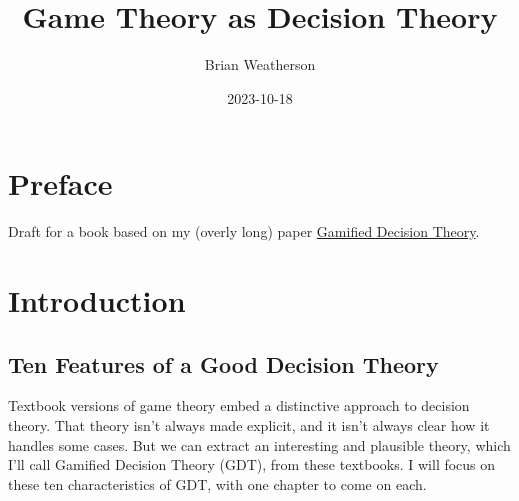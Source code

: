 \documentclass[
  12pt,
  letterpaper,
  DIV=11,
  numbers=noendperiod]{scrreprt}
\title{Game Theory as Decision Theory}
\author{Brian Weatherson}
\date{2023-10-18}
\renewcommand*\contentsname{Table of contents}
\newcommand\contentsname{Table of contents}
\begin{document}
\maketitle
\ifdefined\Shaded\renewenvironment{Shaded}{\begin{tcolorbox}[breakable, frame hidden, boxrule=0pt, interior hidden, sharp corners, borderline west={3pt}{0pt}{shadecolor}, enhanced]}{\end{tcolorbox}}\fi

\renewcommand*\contentsname{Table of contents}
{
\hypersetup{linkcolor=}
\setcounter{tocdepth}{2}
\tableofcontents
}

\hypertarget{preface}{%
\chapter*{Preface}\label{preface}}


Draft for a book based on my (overly long) paper
\href{https://brian.weatherson.org/gdt/gdt.html}{Gamified Decision
Theory}.


\hypertarget{sec-intro}{%
\chapter{Introduction}\label{sec-intro}}

\hypertarget{sec-ten-features}{%
\section{Ten Features of a Good Decision
Theory}\label{sec-ten-features}}

Textbook versions of game theory embed a distinctive approach to
decision theory. That theory isn't always made explicit, and it isn't
always clear how it handles some cases. But we can extract an
interesting and plausible theory, which I'll call Gamified Decision
Theory (GDT), from these textbooks. I will focus on these ten
characteristics of GDT, with one chapter to come on each.
\end{document}
